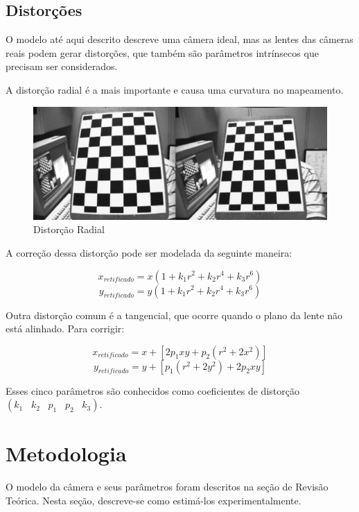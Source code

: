 \documentclass[conference]{IEEEtran}
\begin{document}
\subsection{Distorções}

O modelo até aqui descrito descreve uma câmera ideal, mas as lentes das câmeras reais podem gerar distorções, que também são parâmetros intrínsecos que precisam ser considerados. 

A distorção radial é a mais importante e causa uma curvatura no mapeamento.

\begin{figure}[ht!]
\begin{center}
\includegraphics[width=\columnwidth]{distortion.png}
\caption{Distorção Radial\cite{docsopencv}}
\end{center}
\end{figure}

A correção dessa distorção pode ser modelada da seguinte maneira\cite{docsopencv}: 

    \[x_{retificado} = x( 1 + k_1 r^2 + k_2 r^4 + k_3 r^6)\]
    \[y_{retificado} = y( 1 + k_1 r^2 + k_2 r^4 + k_3 r^6)\]

Outra distorção comum é a tangencial, que ocorre quando o plano da lente não está alinhado. Para corrigir:


\[x_{retificado} = x + [ 2p_1xy + p_2(r^2+2x^2)] \]
\[y_{retificado} = y + [ p_1(r^2+ 2y^2)+ 2p_2xy] \]


Esses cinco parâmetros são conhecidos como coeficientes de distorção
\((k_1 \hspace{10pt} k_2 \hspace{10pt} p_1 \hspace{10pt} p_2 \hspace{10pt} k_3)\)\cite{docsopencv}.

\section{Metodologia}\label{metodologia}
O modelo da câmera e seus parâmetros foram descritos na seção de Revisão Teórica. Nesta seção, descreve-se como estimá-los experimentalmente.
\end{document}
